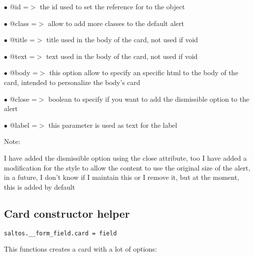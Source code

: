 \documentclass[a4paper]{book}
\begin{document}
\begin{compactitem}
\item[\color{myblue}$\bullet$] @id    =$>$ the id used to set the reference for to the object
\item[\color{myblue}$\bullet$] @class =$>$ allow to add more classes to the default alert
\item[\color{myblue}$\bullet$] @title =$>$ title used in the body of the card, not used if void
\item[\color{myblue}$\bullet$] @text  =$>$ text used in the body of the card, not used if void
\item[\color{myblue}$\bullet$] @body  =$>$ this option allow to specify an specific html to the body of the card, intended
          to personalize the body's card
\item[\color{myblue}$\bullet$] @close =$>$ boolean to specify if you want to add the dismissible option to the alert
\item[\color{myblue}$\bullet$] @label =$>$ this parameter is used as text for the label
\end{compactitem}

Note:

I have added the dismissible option using the close attribute, too I have added a modification
for the style to allow the content to use the original size of the alert, in a future, I don't
know if I maintain this or I remove it, but at the moment, this is added by default

\hypertarget{toc400}{}
\subsection{Card constructor helper}

\begin{lstlisting}
saltos.__form_field.card = field
\end{lstlisting}

This functions creates a card with a lot of options:
\end{document}

